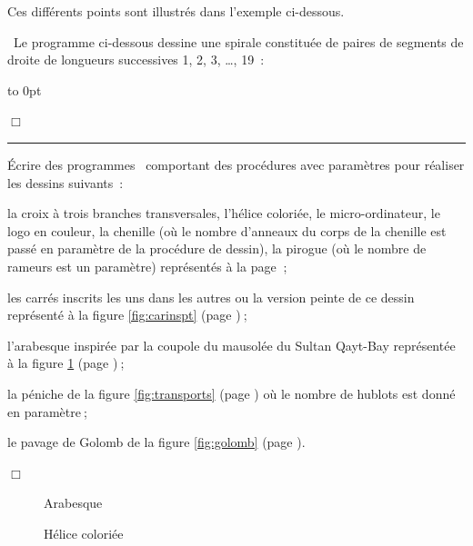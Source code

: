 Ces différents 
points sont illustrés dans l'exemple ci-dessous.

\begin{exemple}{\rm
~Le programme ci-dessous dessine une spirale constituée de paires de segments de droite
de longueurs successives 1, 2, 3, \ldots, 19~:

\newpage
 {\raggedright 
 \mbox{}\hspace*{40mm}\vbox to 0pt{\vspace*{\baselineskip}\vspace*{4cm}
}
 
 }
\noindent $\Box$ }
\end{exemple}


\noindent \rule{137mm}{0.1mm} %
\begin{exercices}{Écrire des programmes \python\ comportant des procédures avec
paramètres pour réaliser les dessins suivants~:

\tiret la croix à trois branches transversales, l'hélice coloriée, le mi\-cro-\-or\-di\-na\-teur,
le logo en couleur, la chenille (où le nombre
d'anneaux du corps de la chenille est passé en paramètre de la procédure de dessin), la pirogue 
(où le nombre de rameurs est un paramètre) représentés à la page \pageref{fig:crx3b}$\:$;

\tiret les carrés inscrits les uns dans les autres
ou la version peinte de ce dessin représenté à la figure \ref{fig:carinspt} (page \pageref{fig:carinspt})$\:$;

\tiret l'arabesque inspirée par la coupole du mausolée du Sultan
         Qayt-\-Bay re\-pré\-sen\-tée à la figure \ref{fig:arab2} (page \pageref{fig:arab2})$\:$;

\tiret la péniche de la figure \ref{fig:transports} (page \pageref{fig:transports}) où le nombre
         de hublots est donné en paramètre$\:$;

\tiret le pavage de Golomb de la figure \ref{fig:golomb} (page \pageref{fig:golomb}).

\noindent $\Box$}\end{exercices}
\twocolumn
\begin{figure}[h]
 \caption{Arabesque}\label{fig:arab2}
\end{figure}
\vfill
\begin{figure}[h]
 \caption{Hélice coloriée}
\end{figure}
